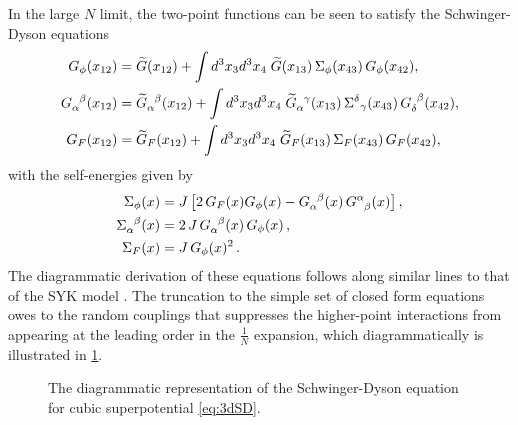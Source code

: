 \documentclass[11pt]{article}
\newcommand{\Gt}{\widetilde{G}}
\begin{document}
In the large $N$ limit, the two-point functions can be seen to satisfy the Schwinger-Dyson equations
%
\begin{equation}\label{eq:3dSD}
\begin{split}
G_\phi(x_{12})
&=
	\Gt(x_{12})+\int d^3x_3d^3x_4\; \Gt(x_{13})\, \Sigma_\phi(x_{43}) \, G_\phi(x_{42}),
\\
G\indices{_\alpha^\beta}(x_{12})
&=
	\Gt\indices{_\alpha^\beta}(x_{12})
	+	\int d^3x_3d^3x_4\; \Gt\indices{_\alpha^\gamma}(x_{13}) \, \Sigma^{\delta}{}_\gamma(x_{43})
	\, G\indices{_\delta^\beta}(x_{42}),
\\
G_F(x_{12}) 
&=
	\Gt_F(x_{12})+\int d^3x_3d^3x_4\; \Gt_F(x_{13})\, \Sigma_F(x_{43})\, G_F(x_{42}),
\end{split}
\end{equation}
%
with the self-energies given by
%
%
\begin{equation}\label{eq:3dSigma}
\begin{split}
\Sigma_\phi(x)&= J \left[2\, G_F(x)G_\phi(x) - G\indices{_\alpha^\beta}(x) \,G\indices{^\alpha_\beta}(x) \right],
\\
\Sigma\indices{_\alpha^\beta}(x)&= 2\, J \, G\indices{_\alpha^\beta}(x) \, G_\phi(x) \,, 
\\
\Sigma_F(x)&= J \, G_\phi(x)^2\,.
\end{split}
\end{equation}
%
The diagrammatic derivation of these equations follows along similar lines to that of the SYK model \cite{Maldacena:2016hyu}. The truncation to the simple set of closed form equations owes to the random couplings that suppresses the higher-point interactions from appearing at the leading order in the $\frac{1}{N}$ expansion, which diagrammatically is illustrated in \cref{fig:SDprop}. 

%
\begin{figure}[h]
\centering
{}
\caption{ The diagrammatic representation of the  Schwinger-Dyson equation for cubic superpotential \eqref{eq:3dSD}.}
\label{fig:SDprop}
\end{figure}
\end{document}
